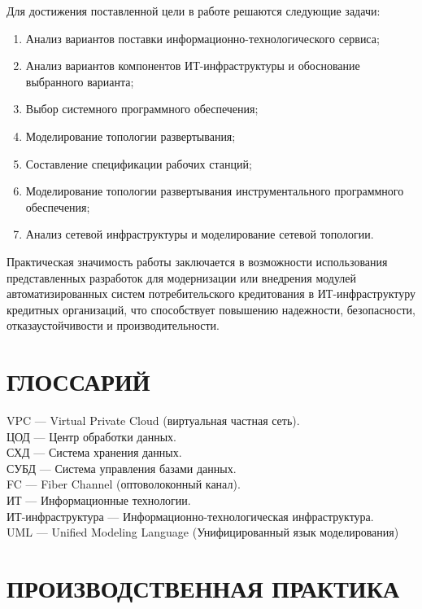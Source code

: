 \documentclass[14pt, a4paper]{extarticle}
\begin{document}
Для достижения поставленной цели в работе решаются следующие задачи:

\begin{enumerate}
  \item Анализ вариантов поставки информационно-технологического сервиса;
  \item Анализ вариантов компонентов ИТ-инфраструктуры и обоснование выбранного варианта;
  \item Выбор системного программного обеспечения;
  \item Моделирование топологии развертывания;
  \item Составление спецификации рабочих станций;
  \item Моделирование топологии развертывания инструментального программного обеспечения;
  \item Анализ сетевой инфраструктуры и моделирование сетевой топологии.
\end{enumerate}

Практическая значимость работы заключается в возможности использования представленных
разработок для модернизации или внедрения модулей автоматизированных систем
потребительского кредитования в ИТ-инфраструктуру кредитных организаций, что
способствует повышению надежности, безопасности, отказаустойчивости и производительности.

\section*{ГЛОССАРИЙ}
{}
\begin{raggedright}
  VPC --- Virtual Private Cloud (виртуальная частная сеть). \\
  ЦОД --- Центр обработки данных. \\
  СХД --- Система хранения данных. \\
  СУБД --- Система управления базами данных. \\
  FC --- Fiber Channel (оптоволоконный канал). \\
  ИТ --- Информационные технологии. \\
  ИТ-инфраструктура --- Информационно-технологическая инфраструктура. \\
  UML --- Unified Modeling Language (Унифицированный язык моделирования) \\
\end{raggedright}

\section{ПРОИЗВОДСТВЕННАЯ ПРАКТИКА}
\end{document}
